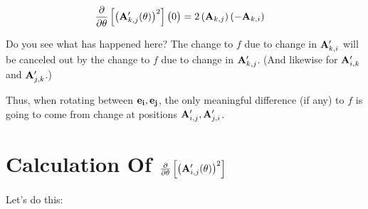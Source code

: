 \documentclass[11pt, oneside]{amsart}
\begin{document}
\begin{equation*}
  \begin{split}
    \frac{\partial }{\partial \theta} \left[ \left( \mathbf{A}'_{k, j}(\theta) \right)^2 \right] \big(0\big)
      ={}&
        2
        \left( \mathbf{A}_{k, j} \right)
        \left( -\mathbf{A}_{k, i} \right)
  \end{split}
\end{equation*}

Do you see what has happened here? The change to $f$ due to change in
$\mathbf{A}'_{k, i}$ will be canceled out by the change to $f$ due to change
in $\mathbf{A}'_{k, j}$. (And likewise for $\mathbf{A}'_{i, k}$ and $\mathbf{A}'_{j,
k}$.)

Thus, when rotating between $\mathbf{e}_{\mathbf{i}}, \mathbf{e}_{\mathbf{j}}$, the only meaningful
difference (if any) to $f$ is going to come from change at positions
$\mathbf{A}'_{i, j}, \mathbf{A}'_{j, i}$.

\section{Calculation Of $\frac{\partial }{\partial \theta} \left[ \left( \mathbf{A}'_{i, j}(\theta) \right)^2 \right]$}

Let's do this:
\end{document}
